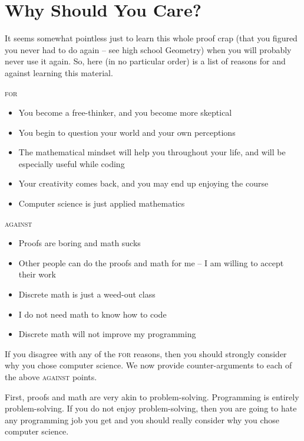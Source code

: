 \documentclass[main.tex]{subfiles}
\begin{document}
\section{Why Should You Care?}

It seems somewhat pointless just to learn this whole proof crap (that you figured you never had to do again -- see high school Geometry) when you will probably never use it again. So, here (in no particular order) is a list of reasons for and against learning this material.

\begin{multicols}{2}
	\begin{center}
		\textsc{for}
	\end{center}
	\begin{itemize}
		\item You become a free-thinker, and you become more skeptical
		\item You begin to question your world and your own perceptions
		\item The mathematical mindset will help you throughout your life, and will be especially useful while coding
		\item Your creativity comes back, and you may end up enjoying the course
		\item Computer science is just applied mathematics
	\end{itemize}
	
	\columnbreak
	
	\begin{center}
		\textsc{against}
	\end{center}
	\begin{itemize}
		\item Proofs are boring and math sucks
		\item Other people can do the proofs and math for me -- I am willing to accept their work
		\item Discrete math is just a weed-out class
		\item I do not need math to know how to code
		\item Discrete math will not improve my programming
	\end{itemize}
\end{multicols}

If you disagree with any of the \textsc{for} reasons, then you should strongly consider why you chose computer science. We now provide counter-arguments to each of the above \textsc{against} points.

First, proofs and math are very akin to problem-solving. Programming is entirely problem-solving. If you do not enjoy problem-solving, then you are going to hate any programming job you get and you should really consider why you chose computer science.
\end{document}
